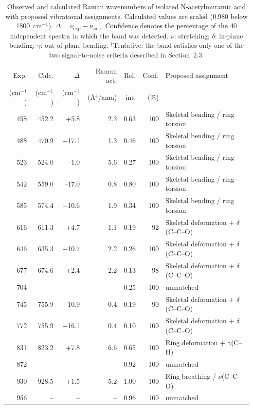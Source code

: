 \documentclass[11pt,a4paper]{article}
\newcommand{\wn}{\ensuremath{\mathrm{cm}^{-1}}}
\begin{document}
\begin{table}[htbp]
\centering
\caption{Observed and calculated Raman wavenumbers of isolated
N-acetylmuramic acid with proposed vibrational assignments.
Calculated values are scaled (0.980 below 1800~\wn{}).
$\Delta = \nu_{\mathrm{exp}} - \nu_{\mathrm{calc}}$. Confidence denotes the
percentage of the 40 independent spectra in which the band was detected.
$\nu$: stretching; $\delta$: in-plane bending; $\gamma$: out-of-plane bending.
$^{\dagger}$Tentative: the band satisfies only one of the two signal-to-noise
criteria described in Section~2.3.}
\label{tab:comparison}
\small
\begin{tabular}{rrrrrrp{4.6cm}}
\toprule
Exp. & Calc. & $\Delta$ & Raman act. & Rel. & Conf. & Proposed assignment \\
(\wn{}) & (\wn{}) & (\wn{}) & (\AA$^4$/amu) & int. & (\%) & \\
\midrule
458 & 452.2 & +5.8 & 2.3 & 0.63 & 100 & Skeletal bending / ring torsion \\
488 & 470.9 & +17.1 & 1.3 & 0.46 & 100 & Skeletal bending / ring torsion \\
523 & 524.0 & -1.0 & 5.6 & 0.27 & 100 & Skeletal bending / ring torsion \\
542 & 559.0 & -17.0 & 0.8 & 0.80 & 100 & Skeletal bending / ring torsion \\
585 & 574.4 & +10.6 & 1.9 & 0.34 & 100 & Skeletal bending / ring torsion \\
616 & 611.3 & +4.7 & 1.1 & 0.19 & 92 & Skeletal deformation + $\delta$(C--C--O) \\
646 & 635.3 & +10.7 & 2.2 & 0.26 & 100 & Skeletal deformation + $\delta$(C--C--O) \\
677 & 674.6 & +2.4 & 2.2 & 0.13 & 98 & Skeletal deformation + $\delta$(C--C--O) \\
704 & -- & -- & -- & 0.25 & 100 & unmatched \\
745 & 755.9 & -10.9 & 0.4 & 0.19 & 90 & Skeletal deformation + $\delta$(C--C--O) \\
772 & 755.9 & +16.1 & 0.4 & 0.10 & 100 & Skeletal deformation + $\delta$(C--C--O) \\
831 & 823.2 & +7.8 & 6.6 & 0.65 & 100 & Ring deformation + $\gamma$(C--H) \\
872 & -- & -- & -- & 0.92 & 100 & unmatched \\
930 & 928.5 & +1.5 & 5.2 & 1.00 & 100 & Ring breathing / $\nu$(C--C--O) \\
956 & -- & -- & -- & 0.96 & 100 & unmatched \\

\end{tabular}
\end{table}
\end{document}
